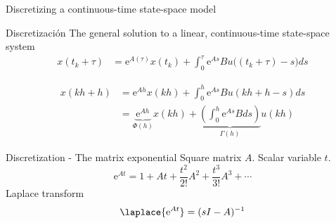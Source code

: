 \documentclass[presentation,aspectratio=1610]{beamer}
\begin{document}
\begin{frame}[label={sec:org8990824}]{Discretizing a continuous-time state-space model}
\end{frame}
\begin{frame}[label={sec:orgedf0d91}]{Discretización}
The general solution to a linear, continuous-time state-space system
\begin{align*}
x(t_k+\tau)& = \mathrm{e}^{A(\tau)} x(t_k) + \int_{0}^\tau \mathrm{e}^{As} B u\big((t_k+\tau)-s) ds
\end{align*}

\begin{center}
\end{center}

 \begin{align*}
  x(kh+h) &= \mathrm{e}^{Ah} x(kh) + \int_{0}^{h} \mathrm{e}^{As} B u(kh+h-s) ds\\
   &= \underbrace{\mathrm{e}^{Ah}}_{\Phi(h)} x(kh) + \underbrace{\left(\int_{0}^h \mathrm{e}^{As} B ds \right)}_{\Gamma(h)} u(kh)
\end{align*}
\end{frame}

\begin{frame}[label={sec:orgaa1f3f9}]{Discretization - The matrix exponential}
Square matrix \(A\). Scalar variable \(t\).
\[ \mathrm{e}^{At} = 1 + At + \frac{t^2}{2!}A^2 + \frac{t^3}{3!} A^3 + \cdots\]
Laplace transform
\[ \laplace{\mathrm{e}^{At}} = (sI - A)^{-1}\]
\end{frame}
\end{document}
